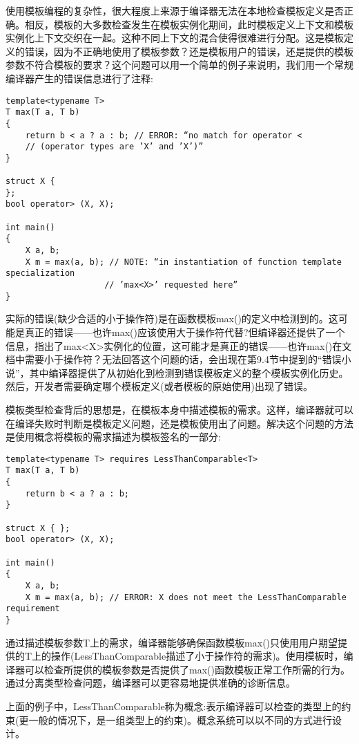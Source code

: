 
使用模板编程的复杂性，很大程度上来源于编译器无法在本地检查模板定义是否正确。相反，模板的大多数检查发生在模板实例化期间，此时模板定义上下文和模板实例化上下文交织在一起。这种不同上下文的混合使得很难进行分配。这是模板定义的错误，因为不正确地使用了模板参数？还是模板用户的错误，还是提供的模板参数不符合模板的要求？这个问题可以用一个简单的例子来说明，我们用一个常规编译器产生的错误信息进行了注释:

\begin{lstlisting}[style=styleCXX]
template<typename T>
T max(T a, T b)
{
	return b < a ? a : b; // ERROR: “no match for operator <
	// (operator types are ’X’ and ’X’)”
}

struct X {
};
bool operator> (X, X);

int main()
{
	X a, b;
	X m = max(a, b); // NOTE: “in instantiation of function template specialization
					// ’max<X>’ requested here”
}
\end{lstlisting}

实际的错误(缺少合适的小于操作符)是在函数模板max()的定义中检测到的。这可能是真正的错误——也许max()应该使用大于操作符代替?但编译器还提供了一个信息，指出了max<X>实例化的位置，这可能才是真正的错误——也许max()在文档中需要小于操作符？无法回答这个问题的话，会出现在第9.4节中提到的“错误小说”，其中编译器提供了从初始化到检测到错误模板定义的整个模板实例化历史。然后，开发者需要确定哪个模板定义(或者模板的原始使用)出现了错误。

模板类型检查背后的思想是，在模板本身中描述模板的需求。这样，编译器就可以在编译失败时判断是模板定义问题，还是模板使用出了问题。解决这个问题的方法是使用概念将模板的需求描述为模板签名的一部分:

\begin{lstlisting}[style=styleCXX]
template<typename T> requires LessThanComparable<T>
T max(T a, T b)
{
	return b < a ? a : b;
}

struct X { };
bool operator> (X, X);

int main()
{
	X a, b;
	X m = max(a, b); // ERROR: X does not meet the LessThanComparable requirement
}
\end{lstlisting}

通过描述模板参数T上的需求，编译器能够确保函数模板max()只使用用户期望提供的T上的操作(LessThanComparable描述了小于操作符的需求)。使用模板时，编译器可以检查所提供的模板参数是否提供了max()函数模板正常工作所需的行为。通过分离类型检查问题，编译器可以更容易地提供准确的诊断信息。

上面的例子中，LessThanComparable称为概念:表示编译器可以检查的类型上的约束(更一般的情况下，是一组类型上的约束)。概念系统可以以不同的方式进行设计。

